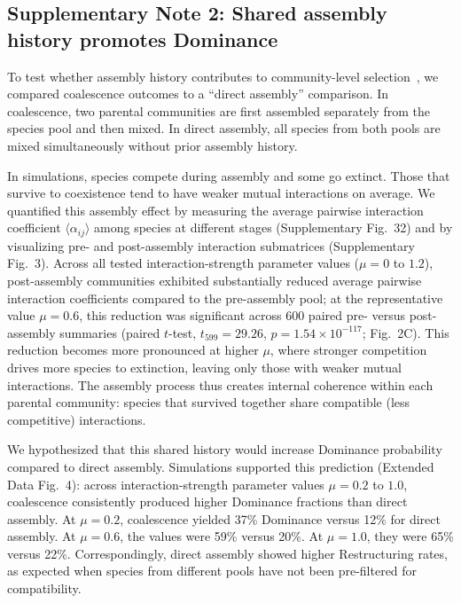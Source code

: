 \subsection*{Supplementary Note 2: Shared assembly history promotes Dominance}
\label{sec:suppl:note2}

To test whether assembly history contributes to community-level selection~\citep{Gilpin1994,Debray2022,Tikhonov2016,DiazColunga2022}, we compared coalescence outcomes to a ``direct assembly'' comparison.  In coalescence, two parental communities are first assembled separately from the species pool and then mixed. In direct assembly, all species from both pools are mixed simultaneously without prior assembly history.

In simulations, species compete during assembly and some go extinct. Those that survive to coexistence tend to have weaker mutual interactions on average. We quantified this assembly effect by measuring the average pairwise interaction coefficient $\langle \alpha_{ij} \rangle$ among species at different stages (Supplementary Fig.~32) and by visualizing pre- and post-assembly interaction submatrices (Supplementary Fig.~3). Across all tested interaction-strength parameter values ($\mu = 0$ to $1.2$), post-assembly communities exhibited substantially reduced average pairwise interaction coefficients compared to the pre-assembly pool; at the representative value $\mu = 0.6$, this reduction was significant across 600 paired pre- versus post-assembly summaries (paired $t$-test, $t_{599} = 29.26$, $p = 1.54 \times 10^{-117}$; Fig.~2C). This reduction becomes more pronounced at higher $\mu$, where stronger competition drives more species to extinction, leaving only those with weaker mutual interactions. The assembly process thus creates internal coherence within each parental community: species that survived together share compatible (less competitive) interactions.

We hypothesized that this shared history would increase Dominance probability compared to direct assembly. Simulations supported this prediction (Extended Data Fig.~4): across interaction-strength parameter values $\mu = 0.2$ to $1.0$, coalescence consistently produced higher Dominance fractions than direct assembly. At $\mu = 0.2$, coalescence yielded 37\% Dominance versus 12\% for direct assembly. At $\mu = 0.6$, the values were 59\% versus 20\%. At $\mu = 1.0$, they were 65\% versus 22\%. Correspondingly, direct assembly showed higher Restructuring rates, as expected when species from different pools have not been pre-filtered for compatibility.

